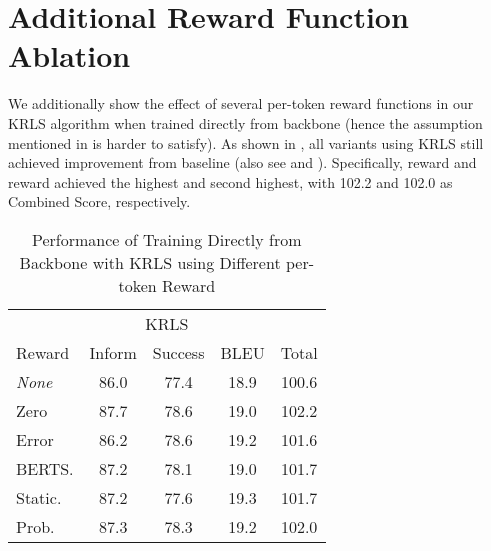 \section{Additional Reward Function Ablation}
\label{sec:Additional Reward Function Ablation}
We additionally show the effect of several per-token reward functions in our KRLS algorithm when trained directly from backbone (hence the assumption mentioned in  is harder to satisfy). As shown in , all variants using KRLS still achieved improvement from baseline (also see  and ). Specifically,  reward and  reward achieved the highest and second highest, with 102.2 and 102.0 as Combined Score, respectively.
\begin{table}[!th]
  \centering
  \begin{tabular}{l c c c c} 
     \toprule
     \multicolumn{5}{c}{KRLS}\\
     Reward & {Inform} & {Success} & {BLEU} & {Total}\\
     \midrule
     \emph{None} & 86.0 & 77.4 & 18.9 & 100.6  \\
     Zero & 87.7 & 78.6 & 19.0 & 102.2\\
     Error & 86.2 & 78.6 & 19.2 & 101.6\\
     BERTS. & 87.2& 78.1 & 19.0 & 101.7\\
     Static. & 87.2 & 77.6 & 19.3 & 101.7\\
     Prob.   & {87.3} & {78.3} & {19.2} & {102.0} \\
     \bottomrule
  \end{tabular}
  \caption{Performance of Training Directly from Backbone with KRLS using Different per-token Reward}
  \label{tbl:token_level_semantic_score}
\end{table}

